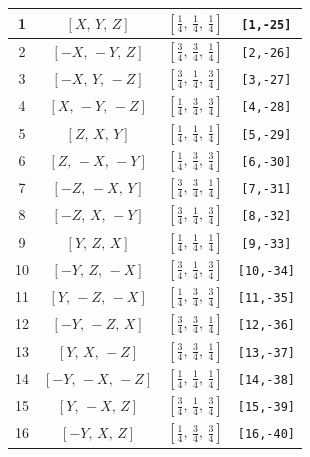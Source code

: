 \documentclass[fleqn,8pt]{jsarticle}
\begin{document}
\begin{longtable}{cccc}
1 & $\left[ X,\, Y,\, Z \right]$ & $\left[ \frac{1}{4},\, \frac{1}{4},\, \frac{1}{4} \right]$ & {\tt [1,-25]} \\ \hline
2 & $\left[ - X,\, - Y,\, Z \right]$ & $\left[ \frac{3}{4},\, \frac{3}{4},\, \frac{1}{4} \right]$ & {\tt [2,-26]} \\ \hline
3 & $\left[ - X,\, Y,\, - Z \right]$ & $\left[ \frac{3}{4},\, \frac{1}{4},\, \frac{3}{4} \right]$ & {\tt [3,-27]} \\ \hline
4 & $\left[ X,\, - Y,\, - Z \right]$ & $\left[ \frac{1}{4},\, \frac{3}{4},\, \frac{3}{4} \right]$ & {\tt [4,-28]} \\ \hline
5 & $\left[ Z,\, X,\, Y \right]$ & $\left[ \frac{1}{4},\, \frac{1}{4},\, \frac{1}{4} \right]$ & {\tt [5,-29]} \\ \hline
6 & $\left[ Z,\, - X,\, - Y \right]$ & $\left[ \frac{1}{4},\, \frac{3}{4},\, \frac{3}{4} \right]$ & {\tt [6,-30]} \\ \hline
7 & $\left[ - Z,\, - X,\, Y \right]$ & $\left[ \frac{3}{4},\, \frac{3}{4},\, \frac{1}{4} \right]$ & {\tt [7,-31]} \\ \hline
8 & $\left[ - Z,\, X,\, - Y \right]$ & $\left[ \frac{3}{4},\, \frac{1}{4},\, \frac{3}{4} \right]$ & {\tt [8,-32]} \\ \hline
9 & $\left[ Y,\, Z,\, X \right]$ & $\left[ \frac{1}{4},\, \frac{1}{4},\, \frac{1}{4} \right]$ & {\tt [9,-33]} \\ \hline
10 & $\left[ - Y,\, Z,\, - X \right]$ & $\left[ \frac{3}{4},\, \frac{1}{4},\, \frac{3}{4} \right]$ & {\tt [10,-34]} \\ \hline
11 & $\left[ Y,\, - Z,\, - X \right]$ & $\left[ \frac{1}{4},\, \frac{3}{4},\, \frac{3}{4} \right]$ & {\tt [11,-35]} \\ \hline
12 & $\left[ - Y,\, - Z,\, X \right]$ & $\left[ \frac{3}{4},\, \frac{3}{4},\, \frac{1}{4} \right]$ & {\tt [12,-36]} \\ \hline
13 & $\left[ Y,\, X,\, - Z \right]$ & $\left[ \frac{3}{4},\, \frac{3}{4},\, \frac{1}{4} \right]$ & {\tt [13,-37]} \\ \hline
14 & $\left[ - Y,\, - X,\, - Z \right]$ & $\left[ \frac{1}{4},\, \frac{1}{4},\, \frac{1}{4} \right]$ & {\tt [14,-38]} \\ \hline
15 & $\left[ Y,\, - X,\, Z \right]$ & $\left[ \frac{3}{4},\, \frac{1}{4},\, \frac{3}{4} \right]$ & {\tt [15,-39]} \\ \hline
16 & $\left[ - Y,\, X,\, Z \right]$ & $\left[ \frac{1}{4},\, \frac{3}{4},\, \frac{3}{4} \right]$ & {\tt [16,-40]} \\ \hline

\end{longtable}
\end{document}
